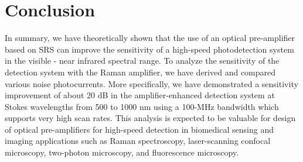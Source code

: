 \documentclass[10pt,letterpaper]{article}
\begin{document}
\section{Conclusion}
\label{conclusion}
In summary, we have theoretically shown that the use of an optical pre-amplifier based on SRS can improve the sensitivity of a high-speed photodetection system in the visible - near infrared spectral range. To analyze the sensitivity of the detection system with the Raman amplifier, we have derived and compared various noise photocurrents. More specifically, we have demonstrated a sensitivity improvement of about 20 dB in the amplifier-enhanced detection system at Stokes wavelengths from 500 to 1000 nm using a 100-MHz bandwidth which supports very high scan rates. This analysis is expected to be valuable for design of optical pre-amplifiers for high-speed detection in biomedical sensing and imaging applications such as Raman spectroscopy, laser-scanning confocal microscopy, two-photon microscopy, and fluorescence microscopy.

\end{document}
